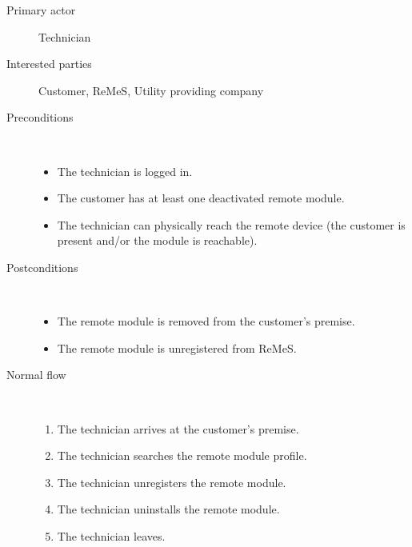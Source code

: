 \begin{description}
	\item[Primary actor] Technician
	\item[Interested parties] Customer, ReMeS, Utility providing company
	\item[Preconditions] \ 
	\begin{itemize}
	  	\item The technician is logged in. 
		\item The customer has at least one deactivated remote module.
		\item The technician can physically reach the remote device (the customer is
		present and/or the module is reachable).
	\end{itemize}
	\item[Postconditions] \ 
	\begin{itemize}
		\item The remote module is removed from the customer's premise.
		\item The remote module is unregistered from ReMeS.
	\end{itemize}
	\item[Normal flow] \ 
	\begin{enumerate}
	  	\item The technician arrives at the customer's premise.
	  	\item The technician searches the remote module profile.
	  	\item The technician unregisters the remote module.
	  	\item The technician uninstalls the remote module.
	  	\item The technician leaves.
	\end{enumerate}
\end{description}
